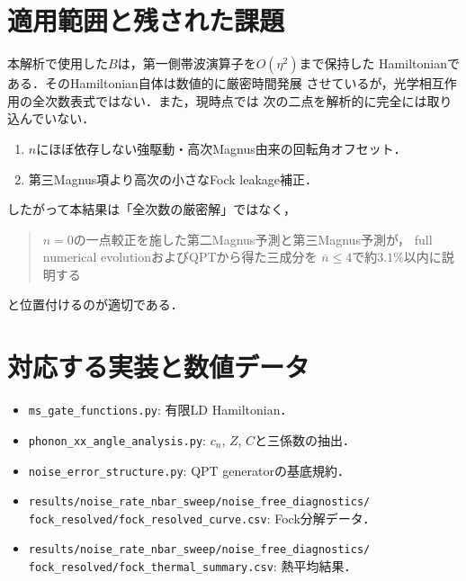 \documentclass[dvipdfmx,a4paper,10pt]{jsarticle}
\begin{document}
\section{適用範囲と残された課題}

本解析で使用した$B$は，第一側帯波演算子を$O(\eta^2)$まで保持した
Hamiltonianである．そのHamiltonian自体は数値的に厳密時間発展
させているが，光学相互作用の全次数表式ではない．また，現時点では
次の二点を解析的に完全には取り込んでいない．
\begin{enumerate}
 \item $n$にほぼ依存しない強駆動・高次Magnus由来の回転角オフセット．
 \item 第三Magnus項より高次の小さなFock leakage補正．
\end{enumerate}
したがって本結果は「全次数の厳密解」ではなく，
\begin{quote}
 $n=0$の一点較正を施した第二Magnus予測と第三Magnus予測が，
 full numerical evolutionおよびQPTから得た三成分を
 $\bar n\leq4$で約$3.1\%$以内に説明する
\end{quote}
と位置付けるのが適切である．

\section*{対応する実装と数値データ}

\begin{itemize}
 \item \texttt{ms\_gate\_functions.py}: 有限LD Hamiltonian．
 \item \texttt{phonon\_xx\_angle\_analysis.py}:
       $c_n$, $Z$, $C$と三係数の抽出．
 \item \texttt{noise\_error\_structure.py}:
       QPT generatorの基底規約．
 \item \texttt{results/noise\_rate\_nbar\_sweep/noise\_free\_diagnostics/}\\
       \texttt{fock\_resolved/fock\_resolved\_curve.csv}:
       Fock分解データ．
 \item \texttt{results/noise\_rate\_nbar\_sweep/noise\_free\_diagnostics/}\\
       \texttt{fock\_resolved/fock\_thermal\_summary.csv}:
       熱平均結果．
\end{itemize}
\end{document}
